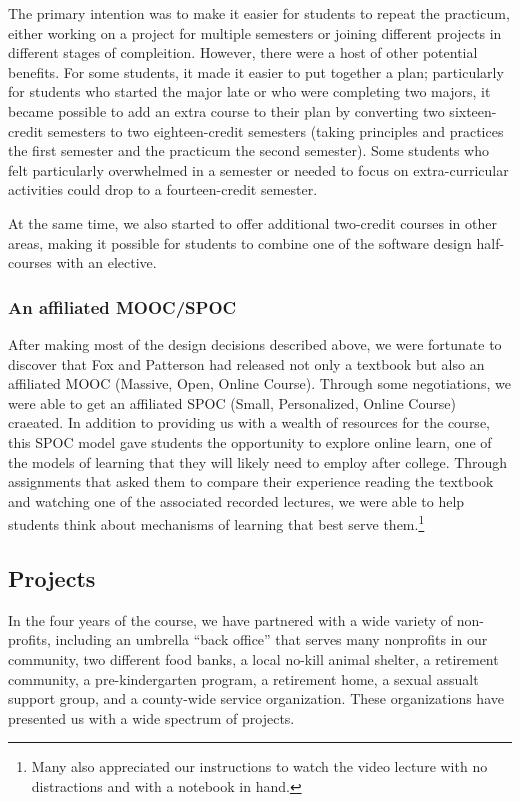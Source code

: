 The primary intention was to make it easier for students to repeat
the practicum, either working on a project for multiple semesters
or joining different projects in different stages of compleition.
However, there were a host of other potential benefits.  For some
students, it made it easier to put together a plan; particularly
for students who started the major late or who were completing two
majors, it became possible to add an extra course to their plan by
converting two sixteen-credit semesters to two eighteen-credit
semesters (taking principles and practices the first semester and
the practicum the second semester).  Some students who felt particularly
overwhelmed in a semester or needed to focus on extra-curricular activities
could drop to a fourteen-credit semester.

At the same time, we also started to offer additional two-credit
courses in other areas, making it possible for students to combine
one of the software design half-courses with an elective.

\subsubsection{An affiliated MOOC/SPOC}

After making most of the design decisions described above, we were
fortunate to discover that Fox and Patterson had released not only
a textbook \cite{saasbook} but also an affiliated MOOC (Massive,
Open, Online Course).  Through some negotiations, we were able to
get an affiliated SPOC (Small, Personalized, Online Course) craeated.
In addition to providing us with a wealth of resources for the
course, this SPOC model gave students the opportunity to explore
online learn, one of the models of learning that they will likely
need to employ after college.  Through assignments that asked them
to compare their experience reading the textbook and watching one
of the associated recorded lectures, we were able to help students
think about mechanisms of learning that best serve them.\footnote{Many also
appreciated our instructions to watch the video lecture with no distractions
and with a notebook in hand.}

\subsection{Projects}

In the four years of the course, we have partnered with a wide
variety of non-profits, including an umbrella ``back office'' that
serves many nonprofits in our community, two different food banks,
a local no-kill animal shelter, a retirement community, a
pre-kindergarten program, a retirement home, a sexual assualt support
group, and a county-wide service organization.  These organizations
have presented us with a wide spectrum of projects.

